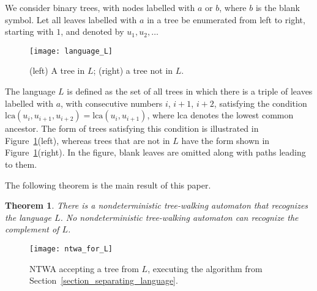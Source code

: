 \documentclass[12pt,a4paper]{article}
\newtheorem{theorem}{Theorem}
\theoremstyle{definition}
\begin{document}
We consider binary trees,
with nodes labelled with $a$ or $b$, where $b$ is the blank symbol.
Let all leaves labelled with $a$ in a tree
be enumerated from left to right, starting with $1$,
and denoted by $u_1, u_2, \ldots$

\begin{figure}[t]
	\centerline{\texttt{[image: language\_L]}}
	\caption{(left) A tree in $L$; (right) a tree not in $L$.}
	\label{f:language_L}
\end{figure}

The language $L$ is defined as the set of all trees
in which there is a triple of leaves labelled with $a$,
with consecutive numbers $i$, $i+1$, $i+2$,
satisfying the condition
$\mathrm{lca}(u_i,u_{i+1},u_{i+2}) = \mathrm{lca}(u_i,u_{i+1})$,
where lca denotes the lowest common ancestor.
The form of trees satisfying this condition is illustrated in Figure~\ref{f:language_L}(left),
whereas trees that are not in $L$ have the form shown in Figure~\ref{f:language_L}(right).
In the figure, blank leaves are omitted along with paths leading to them.

The following theorem is the main result of this paper.

\begin{theorem}\label{ntwa_rec_L_but_not_compl_of_L}
There is a nondeterministic tree-walking automaton that recognizes the language $L$.
No nondeterministic tree-walking automaton can recognize the complement of $L$.
\end{theorem}

\begin{figure}[t]
	\centerline{\texttt{[image: ntwa\_for\_L]}}
	\caption{NTWA accepting a tree from $L$, executing the algorithm from Section~\ref{section_separating_language}.}
	\label{f:L_recognizing_NTWA}
\end{figure}
\end{document}
